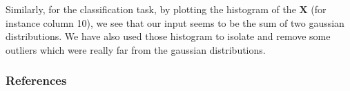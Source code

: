 \documentclass{article} %
\begin{document}
Similarly, for the classification task, by plotting the histogram of the $\mathbf{X}$ (for instance column 10), we see that our input seems to be the sum of two gaussian distributions. We have also used those histogram to isolate and remove some outliers which were really far from the gaussian distributions.

\begin{figure}[!t]
\center
{}
\caption{}
\end{figure}

\subsubsection*{References}
\end{document}
